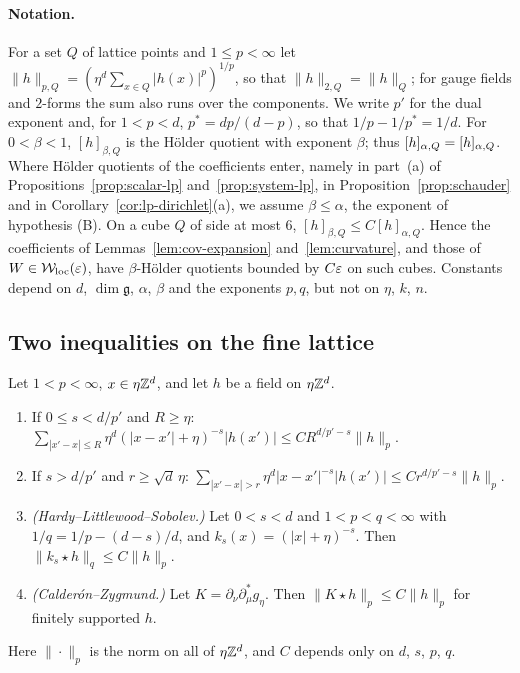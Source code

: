 \paragraph{Notation.} For a set $Q$ of lattice points and $1\le p<\infty$ let $\|h\|_{p,Q}=(\eta^d\sum_{x\in Q}|h(x)|^p)^{1/p}$, so that $\|h\|_{2,Q}=\|h\|_Q$; for gauge fields and $2$-forms the sum also runs over the components. We write $p'$ for the dual exponent and, for $1<p<d$, $p^*=dp/(d-p)$, so that $1/p-1/p^*=1/d$. For $0<\beta<1$, $[h]_{\beta,Q}$ is the H\"older quotient with exponent $\beta$; thus $[h]_{\alpha,Q}=[h]_{\alpha,Q}$. Where H\"older quotients of the coefficients enter, namely in part~(a) of Propositions~\ref{prop:scalar-lp} and~\ref{prop:system-lp}, in Proposition~\ref{prop:schauder} and in Corollary~\ref{cor:lp-dirichlet}(a), we assume $\beta\le\alpha$, the exponent of hypothesis (B). On a cube $Q$ of side at most $6$, $[h]_{\beta,Q}\le C[h]_{\alpha,Q}$. Hence the coefficients of Lemmas~\ref{lem:cov-expansion} and~\ref{lem:curvature}, and those of $W\in\mathcal W_{\rm loc}(\varepsilon)$, have $\beta$-H\"older quotients bounded by $C\varepsilon$ on such cubes. Constants depend on $d$, $\dim\mathfrak g$, $\alpha$, $\beta$ and the exponents $p,q$, but not on $\eta$, $k$, $n$.

\subsection{Two inequalities on the fine lattice}\label{ss:43.1}

\begin{lemma}\label{lem:lp-kernels}
Let $1<p<\infty$, $x\in\eta\mathbb Z^d$, and let $h$ be a field on $\eta\mathbb Z^d$.
\begin{enumerate}[label=(\alph*)]
\item If $0\le s<d/p'$ and $R\ge\eta$: $\sum_{|x'-x|\le R}\eta^d(|x-x'|+\eta)^{-s}|h(x')|\le CR^{d/p'-s}\|h\|_p$.
\item If $s>d/p'$ and $r\ge\sqrt d\,\eta$: $\sum_{|x'-x|>r}\eta^d|x-x'|^{-s}|h(x')|\le Cr^{d/p'-s}\|h\|_p$.
\item \emph{(Hardy--Littlewood--Sobolev.)} Let $0<s<d$ and $1<p<q<\infty$ with $1/q=1/p-(d-s)/d$, and $k_s(x)=(|x|+\eta)^{-s}$. Then $\|k_s\star h\|_q\le C\|h\|_p$.
\item \emph{(Calder\'on--Zygmund.)} Let $K=\partial_\nu\partial^*_\mu g_\eta$. Then $\|K\star h\|_p\le C\|h\|_p$ for finitely supported $h$.
\end{enumerate}
Here $\|\cdot\|_p$ is the norm on all of $\eta\mathbb Z^d$, and $C$ depends only on $d$, $s$, $p$, $q$.
\end{lemma}

